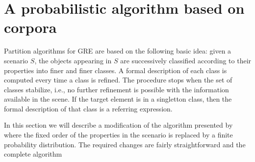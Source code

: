 \section{A probabilistic algorithm based on corpora} \label{sec:algorithm}

Partition algorithms for GRE are based on the following basic idea: given a 
scenario $S$, the objects appearing in $S$ are successively classified according
to their properties into finer and finer classes. A formal description of each 
class is computed every time a class is refined.   The procedure stops when the 
set of classes stabilize, i.e., no further refinement is possible with the information 
available in the scene.  If the target element is in a singletton class, then 
the formal description of that class is a referring expression. 

In this section we will describe a modification of the algorithm presented 
by~\cite{arec2:2008:Areces} where the fixed order of the properties in the 
scenario is replaced by a finite probability distribution.  The required changes
are fairly straightforward and the complete algorithm 


\newcommand{\nBlue}{\mathit{blue}\xspace}
\newcommand{\nGreen}{\mathit{green}\xspace}
\newcommand{\nSmall}{\mathit{small}\xspace}
\newcommand{\nBig}{\mathit{big}\xspace}
\newcommand{\nBall}{\mathit{ball}\xspace}
\newcommand{\nCube}{\mathit{cube}\xspace}
\newcommand{\nOntop}{\mathit{ontop}\xspace}
\newcommand{\nBelow}{\mathit{below}\xspace}
\newcommand{\nRightof}{\mathit{rightof}\xspace}
\newcommand{\nLeftof}{\mathit{leftof}\xspace}

